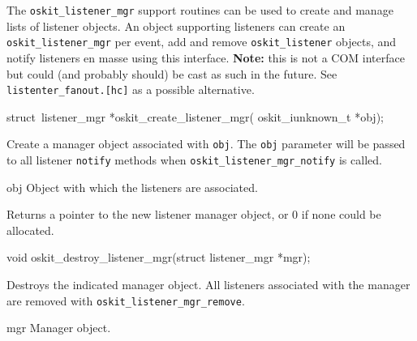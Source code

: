 \label{oskit-listener-mgr}

The \texttt{oskit_listener_mgr} support routines can be used to create
and manage lists of listener objects.
An object supporting listeners can create an \texttt{oskit_listener_mgr}
per event, add and remove \texttt{oskit_listener} objects, and notify
listeners en masse using this interface.
\textbf{Note:} this is not a COM interface but could (and probably should)
be cast as such in the future.  See \texttt{listenter_fanout.[hc]} as a
possible alternative.

\begin{apisyn}

	\funcproto struct~listener_mgr *oskit_create_listener_mgr(
		oskit_iunknown_t *obj);
\end{apisyn}
\begin{apidesc}
	Create a manager object associated with \texttt{obj}.
	The \texttt{obj} parameter will be passed to all listener
	\texttt{notify} methods when \texttt{oskit_listener_mgr_notify}
	is called.
\end{apidesc}
\begin{apiparm}
	\item[obj]
		Object with which the listeners are associated.
\end{apiparm}
\begin{apiret}
	Returns a pointer to the new listener manager object,
	or 0 if none could be allocated.
\end{apiret}

\begin{apisyn}

	\funcproto void
	oskit_destroy_listener_mgr(struct listener_mgr *mgr);
\end{apisyn}
\begin{apidesc}
	Destroys the indicated manager object.
	All listeners associated with the manager are removed with
	\texttt{oskit_listener_mgr_remove}.
\end{apidesc}
\begin{apiparm}
	\item[mgr]
		Manager object.
\end{apiparm}

